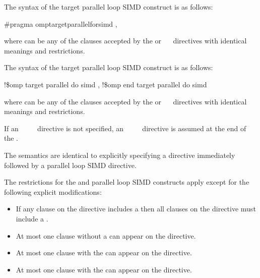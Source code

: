 \syntax
\ccppspecificstart
The syntax of the target parallel loop SIMD construct is as follows:

\begin{boxedcode}
\#pragma omp\plc{ }target\plc{ }parallel\plc{ }for\plc{ }simd \plc{[clause[ [},\plc{] clause] ... ]}
\end{boxedcode}

where  can be any of the clauses accepted by the  or
~~ directives with identical meanings and restrictions.
\ccppspecificend

\begin{samepage}
\fortranspecificstart
The syntax of the target parallel loop SIMD construct is as follows:

\begin{boxedcode}
!\$omp target parallel do simd \plc{[clause[ [},\plc{] clause] ... ]}
\plc{[}!\$omp end target parallel do simd\plc{]}
\end{boxedcode}
\end{samepage}

where  can be any of the clauses accepted by the  or 
~~ directives with identical meanings and restrictions.

If an ~~~~ directive is not specified, an 
~~~~ directive is assumed at the end of 
the .
\fortranspecificend

\descr
The semantics are identical to explicitly specifying a  directive
immediately followed by a parallel loop SIMD directive.


\restrictions
The restrictions for the  and parallel loop SIMD constructs apply except for the following explicit modifications:

\begin{itemize}
\item If any  clause on the directive includes a
       then all  clauses 
      on the directive must include a .

\item At most one  clause without a 
       can appear on the directive.

\item At most one  clause with the  
       can appear on the directive.


\item At most one  clause with the  
       can appear on the directive.
\end{itemize}

